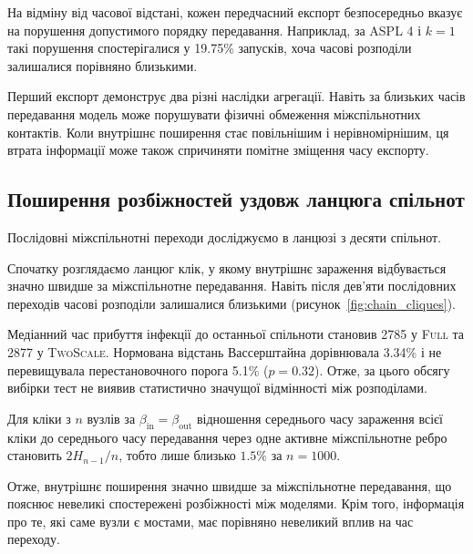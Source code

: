 \documentclass[a4paper,fleqn]{cas-sc}
\newcommand{\Full}{\textup{\textsc{Full}}}
\newcommand{\TS}{\textup{\textsc{TwoScale}}}
\begin{document}
На відміну від часової відстані,
кожен передчасний експорт безпосередньо
вказує на порушення допустимого порядку
передавання. Наприклад, за ASPL 4
і $k=1$ такі порушення спостерігалися
у 19.75\% запусків, хоча часові
розподіли залишалися порівняно близькими.

Перший експорт демонструє
два різні наслідки агрегації.
Навіть за близьких часів передавання
модель може порушувати фізичні
обмеження міжспільнотних контактів.
Коли внутрішнє поширення стає повільнішим
і нерівномірнішим, ця втрата інформації
може також спричиняти помітне
зміщення часу експорту.


\subsection{Поширення розбіжностей
уздовж ланцюга спільнот}
\label{sec:res_chain_random}

Послідовні міжспільнотні переходи
досліджуємо в ланцюзі з десяти спільнот.

Спочатку розглядаємо ланцюг клік,
у якому внутрішнє зараження відбувається
значно швидше за міжспільнотне передавання.
Навіть після дев'яти послідовних переходів
часові розподіли залишалися близькими
(рисунок~\ref{fig:chain_cliques}).

Медіанний час прибуття інфекції
до останньої спільноти становив
2785 у \Full{} та 2877 у \TS{}.
Нормована відстань Вассерштайна
дорівнювала 3.34\% і не перевищувала
перестановочного порога 5.1\%
($p=0.32$). Отже, за цього обсягу
вибірки тест не виявив статистично
значущої відмінності між розподілами.

Для кліки з $n$ вузлів за
$\beta_{\mathrm{in}}=\beta_{\mathrm{out}}$
відношення середнього часу зараження
всієї кліки до середнього часу
передавання через одне активне
міжспільнотне ребро становить
$2H_{n-1}/n$, тобто лише близько
$1.5\%$ за $n=1000$.

Отже, внутрішнє поширення значно
швидше за міжспільнотне передавання,
що пояснює невеликі спостережені
розбіжності між моделями. Крім того, інформація про те, які саме вузли є мостами, має порівняно невеликий вплив на час переходу.
\end{document}
